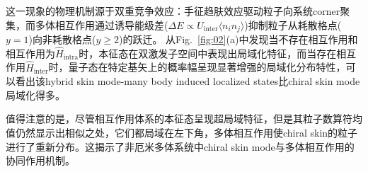 \documentclass[longbibliography, aps, prx, amsmath, amssymb, amsfonts, twocolumn,superscriptaddress, footinbib]{revtex4-1}
\begin{document}
	这一现象的物理机制源于双重竞争效应：手征趋肤效应驱动粒子向系统corner聚集，而多体相互作用通过诱导能级差($\Delta E \propto U_{\text{inter}}\langle n_i n_j \rangle$)抑制粒子从耗散格点($y=1$)向非耗散格点($y\geq2$)的跃迁。
	从Fig.~\ref{fig:02}(a)中发现当不存在相互作用和相互作用为$\hat{H}_{\text{intra}}$时，本征态在双激发子空间中表现出局域化特征，而当存在相互作用$\hat{H}_{\text{inter}}$时，量子态在特定基矢上的概率幅呈现显著增强的局域化分布特性，可以看出该hybrid skin mode-many body induced localized states比chiral skin mode局域化得多。

	值得注意的是，尽管相互作用体系的本征态呈现超局域特征，但是其粒子数算符均值仍然显示出相似之处，它们都局域在左下角，多体相互作用使chiral skin的粒子进行了重新分布。这揭示了非厄米多体系统中chiral skin mode与多体相互作用的协同作用机制。
\end{document}

